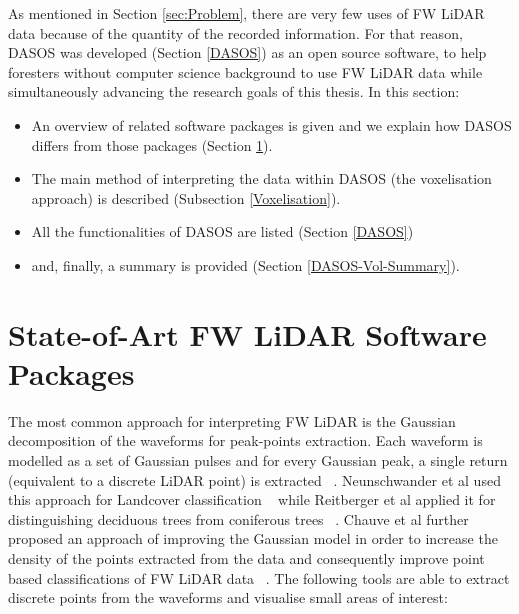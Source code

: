 \documentclass{subfiles}
\begin{document}
	
	\par As mentioned in Section \ref{sec:Problem}, there are very few uses of FW LiDAR data because of the quantity of the recorded information. For that reason, DASOS was developed (Section \ref{DASOS}) as an open source software, to help foresters without computer science background to use FW LiDAR data while simultaneously advancing the research goals of this thesis.  In this section:
	
	\begin{itemize}
		\item An overview of related software packages is given and we explain how DASOS differs from those packages (Section \ref{LiDARsoftwares}).
		\item The main method of interpreting the data within DASOS (the voxelisation approach) is described (Subsection \ref{Voxelisation}).
		\item All the functionalities of DASOS are listed (Section \ref{DASOS})
		\item and, finally, a summary is provided (Section \ref{DASOS-Vol-Summary}).
	\end{itemize}
	
	
	
	
	\section{State-of-Art FW LiDAR Software Packages}\label{LiDARsoftwares}
	
	\par The most common approach for interpreting FW LiDAR is the Gaussian decomposition of the waveforms for peak-points extraction. Each waveform is modelled as a set of Gaussian pulses and for every Gaussian peak, a single return (equivalent to a discrete LiDAR point) is extracted ~\cite{Wanger2006}. Neunschwander et al used this approach for Landcover classification ~\cite{Neuenschwander2009} while Reitberger et al applied it for distinguishing deciduous trees from coniferous trees ~\cite{Reitberger2008}. Chauve et al further proposed an approach of improving the Gaussian model in order to increase the density of the points extracted from the data and consequently improve point based classifications of FW LiDAR data ~\cite{Chauve2007}.  The following tools are able to extract discrete points from the waveforms and visualise small areas of interest:
\end{document}
